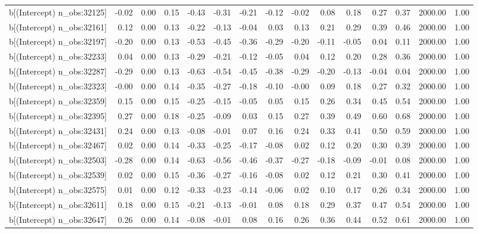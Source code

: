 \begin{table}[ht]
\begin{tabular}{rrrrrrrrrrrrrrr}
  b[(Intercept) n\_obs:32125] & -0.02 & 0.00 & 0.15 & -0.43 & -0.31 & -0.21 & -0.12 & -0.02 & 0.08 & 0.18 & 0.27 & 0.37 & 2000.00 & 1.00 \\ 
  b[(Intercept) n\_obs:32161] & 0.12 & 0.00 & 0.13 & -0.22 & -0.13 & -0.04 & 0.03 & 0.13 & 0.21 & 0.29 & 0.39 & 0.46 & 2000.00 & 1.00 \\ 
  b[(Intercept) n\_obs:32197] & -0.20 & 0.00 & 0.13 & -0.53 & -0.45 & -0.36 & -0.29 & -0.20 & -0.11 & -0.05 & 0.04 & 0.11 & 2000.00 & 1.00 \\ 
  b[(Intercept) n\_obs:32233] & 0.04 & 0.00 & 0.13 & -0.29 & -0.21 & -0.12 & -0.05 & 0.04 & 0.12 & 0.20 & 0.28 & 0.36 & 2000.00 & 1.00 \\ 
  b[(Intercept) n\_obs:32287] & -0.29 & 0.00 & 0.13 & -0.63 & -0.54 & -0.45 & -0.38 & -0.29 & -0.20 & -0.13 & -0.04 & 0.04 & 2000.00 & 1.00 \\ 
  b[(Intercept) n\_obs:32323] & -0.00 & 0.00 & 0.14 & -0.35 & -0.27 & -0.18 & -0.10 & -0.00 & 0.09 & 0.18 & 0.27 & 0.32 & 2000.00 & 1.00 \\ 
  b[(Intercept) n\_obs:32359] & 0.15 & 0.00 & 0.15 & -0.25 & -0.15 & -0.05 & 0.05 & 0.15 & 0.26 & 0.34 & 0.45 & 0.54 & 2000.00 & 1.00 \\ 
  b[(Intercept) n\_obs:32395] & 0.27 & 0.00 & 0.18 & -0.25 & -0.09 & 0.03 & 0.15 & 0.27 & 0.39 & 0.49 & 0.60 & 0.68 & 2000.00 & 1.00 \\ 
  b[(Intercept) n\_obs:32431] & 0.24 & 0.00 & 0.13 & -0.08 & -0.01 & 0.07 & 0.16 & 0.24 & 0.33 & 0.41 & 0.50 & 0.59 & 2000.00 & 1.00 \\ 
  b[(Intercept) n\_obs:32467] & 0.02 & 0.00 & 0.14 & -0.33 & -0.25 & -0.17 & -0.08 & 0.02 & 0.12 & 0.20 & 0.30 & 0.39 & 2000.00 & 1.00 \\ 
  b[(Intercept) n\_obs:32503] & -0.28 & 0.00 & 0.14 & -0.63 & -0.56 & -0.46 & -0.37 & -0.27 & -0.18 & -0.09 & -0.01 & 0.08 & 2000.00 & 1.00 \\ 
  b[(Intercept) n\_obs:32539] & 0.02 & 0.00 & 0.15 & -0.36 & -0.27 & -0.16 & -0.08 & 0.02 & 0.12 & 0.21 & 0.30 & 0.41 & 2000.00 & 1.00 \\ 
  b[(Intercept) n\_obs:32575] & 0.01 & 0.00 & 0.12 & -0.33 & -0.23 & -0.14 & -0.06 & 0.02 & 0.10 & 0.17 & 0.26 & 0.34 & 2000.00 & 1.00 \\ 
  b[(Intercept) n\_obs:32611] & 0.18 & 0.00 & 0.15 & -0.21 & -0.13 & -0.01 & 0.08 & 0.18 & 0.29 & 0.37 & 0.47 & 0.54 & 2000.00 & 1.00 \\ 
  b[(Intercept) n\_obs:32647] & 0.26 & 0.00 & 0.14 & -0.08 & -0.01 & 0.08 & 0.16 & 0.26 & 0.36 & 0.44 & 0.52 & 0.61 & 2000.00 & 1.00 \\ 

\end{tabular}
\end{table}
